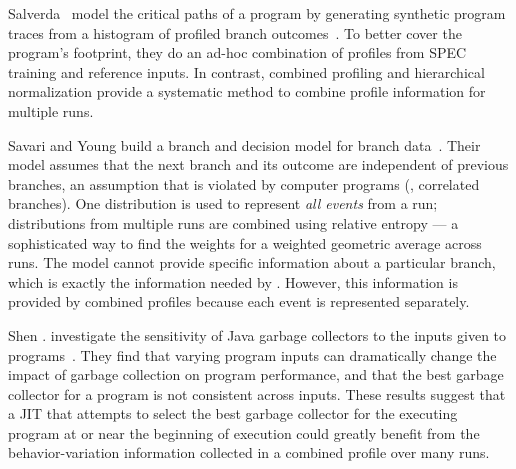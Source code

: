 Salverda \etal\ model the critical paths of a program by generating
synthetic program traces from a histogram of profiled branch
outcomes~\cite{SalverdaCGO08}. To better cover the program's
footprint, they do an ad-hoc combination of profiles from SPEC
training and reference inputs.  In contrast, combined profiling and
hierarchical normalization provide a systematic method to combine
profile information for multiple runs.

Savari and Young build a branch and decision model for branch
data~\cite{SavariYoungJIPL00}.  Their model assumes that the next
branch and its outcome are independent of previous branches, an
assumption that is violated by computer programs (\eg, correlated
branches).  One distribution is used to represent {\em all events}
from a run; distributions from multiple runs are combined using
relative entropy --- a sophisticated way to find the weights for a
weighted geometric average across runs.  %
The model cannot provide
specific information about a particular branch, which is exactly the
information needed by \FDO.  However, this information is provided by
combined profiles because each event is represented separately.

Shen \etal. investigate the sensitivity of Java garbage collectors to
the inputs given to programs~\cite{ShenSIGOPS09}.  They find that
varying program inputs can dramatically change the impact of garbage
collection on program performance, and that the best garbage collector
for a program is not consistent across inputs.  %
These results suggest
that a JIT that attempts to select the best garbage collector for the
executing program at or near the beginning of execution could greatly
benefit from the behavior-variation information collected in a
combined profile over many runs.
